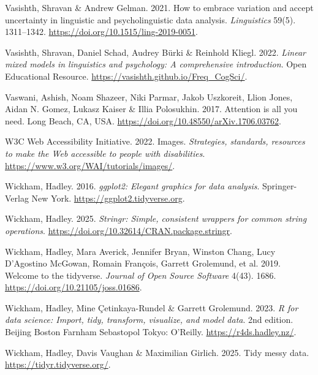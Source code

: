 \documentclass[
  letterpaper,
  DIV=11,
  numbers=noendperiod]{scrreprt}
\newlength{\cslhangindent}
\newenvironment{CSLReferences}[2] %
 {\begin{list}{}{%
  \setlength{\itemindent}{0pt}
  \setlength{\leftmargin}{0pt}
  \setlength{\parsep}{0pt}
  \ifodd #1
   \setlength{\leftmargin}{\cslhangindent}
   \setlength{\itemindent}{-1\cslhangindent}
  \fi
  \setlength{\itemsep}{#2\baselineskip}}}
 {\end{list}}
\begin{document}
\begin{CSLReferences}{1}{0}
Vasishth, Shravan \& Andrew Gelman. 2021. How to embrace variation and
accept uncertainty in linguistic and psycholinguistic data analysis.
\emph{Linguistics} 59(5). 1311--1342.
\url{https://doi.org/10.1515/ling-2019-0051}.

Vasishth, Shravan, Daniel Schad, Audrey Bürki \& Reinhold Kliegl. 2022.
\emph{Linear mixed models in linguistics and psychology: A comprehensive
introduction}. Open Educational Resource.
\url{https://vasishth.github.io/Freq_CogSci/}.

Vaswani, Ashish, Noam Shazeer, Niki Parmar, Jakob Uszkoreit, Llion
Jones, Aidan N. Gomez, Lukasz Kaiser \& Illia Polosukhin. 2017.
Attention is all you need. Long Beach, CA, USA.
\url{https://doi.org/10.48550/arXiv.1706.03762}.

W3C Web Accessibility Initiative. 2022. Images. \emph{Strategies,
standards, resources to make the Web accessible to people with
disabilities}. \url{https://www.w3.org/WAI/tutorials/images/}.

Wickham, Hadley. 2016. \emph{ggplot2: Elegant graphics for data
analysis}. Springer-Verlag New York.
\url{https://ggplot2.tidyverse.org}.

Wickham, Hadley. 2025. \emph{Stringr: Simple, consistent wrappers for
common string operations}.
\url{https://doi.org/10.32614/CRAN.package.stringr}.

Wickham, Hadley, Mara Averick, Jennifer Bryan, Winston Chang, Lucy
D'Agostino McGowan, Romain François, Garrett Grolemund, et al. 2019.
Welcome to the {tidyverse}. \emph{Journal of Open Source Software}
4(43). 1686. \url{https://doi.org/10.21105/joss.01686}.

Wickham, Hadley, Mine Çetinkaya-Rundel \& Garrett Grolemund. 2023.
\emph{R for data science: Import, tidy, transform, visualize, and model
data}. 2nd edition. Beijing Boston Farnham Sebastopol Tokyo: O'Reilly.
\url{https://r4ds.hadley.nz/}.

Wickham, Hadley, Davis Vaughan \& Maximilian Girlich. 2025. Tidy messy
data. \url{https://tidyr.tidyverse.org/}.


\end{CSLReferences}
\end{document}
